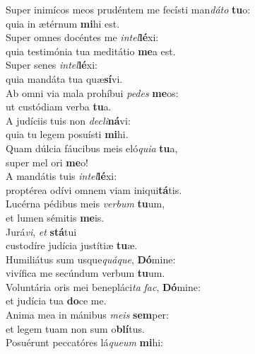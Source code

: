 \evenverse Super inimícos meos prudéntem me fecísti man\textit{dá}\textit{to} \textbf{tu}o:~\*\\
\evenverse quia in ætérnum \textbf{mi}hi est.\\
\oddverse Super omnes docéntes me \textit{in}\textit{tel}\textbf{lé}xi:~\*\\
\oddverse quia testimónia tua meditátio \textbf{me}a est.\\
\evenverse Super senes \textit{in}\textit{tel}\textbf{lé}xi:~\*\\
\evenverse quia mandáta tua quæ\textbf{sí}vi.\\
\oddverse Ab omni via mala prohíbui \textit{pe}\textit{des} \textbf{me}os:~\*\\
\oddverse ut custódiam verba \textbf{tu}a.\\
\evenverse A judíciis tuis non \textit{de}\textit{cli}\textbf{ná}vi:~\*\\
\evenverse quia tu legem posuísti \textbf{mi}hi.\\
\oddverse Quam dúlcia fáucibus meis eló\textit{qui}\textit{a} \textbf{tu}a,~\*\\
\oddverse super mel ori \textbf{me}o!\\
\evenverse A mandátis tuis \textit{in}\textit{tel}\textbf{lé}xi:~\*\\
\evenverse proptérea odívi omnem viam iniqui\textbf{tá}tis.\\
\oddverse Lucérna pédibus meis \textit{ver}\textit{bum} \textbf{tu}um,~\*\\
\oddverse et lumen sémitis \textbf{me}is.\\
\evenverse Jurá\textit{vi}, \textit{et} \textbf{stá}tui~\*\\
\evenverse custodíre judícia justítiæ \textbf{tu}æ.\\
\oddverse Humiliátus sum usque\textit{quá}\textit{que}, \textbf{Dó}mine:~\*\\
\oddverse vivífica me secúndum verbum \textbf{tu}um.\\
\evenverse Voluntária oris mei benepláci\textit{ta} \textit{fac}, \textbf{Dó}mine:~\*\\
\evenverse et judícia tua \textbf{do}ce me.\\
\oddverse Anima mea in mánibus \textit{me}\textit{is} \textbf{sem}per:~\*\\
\oddverse et legem tuam non sum o\textbf{blí}tus.\\
\evenverse Posuérunt peccatóres lá\textit{que}\textit{um} \textbf{mi}hi:~\*\\
